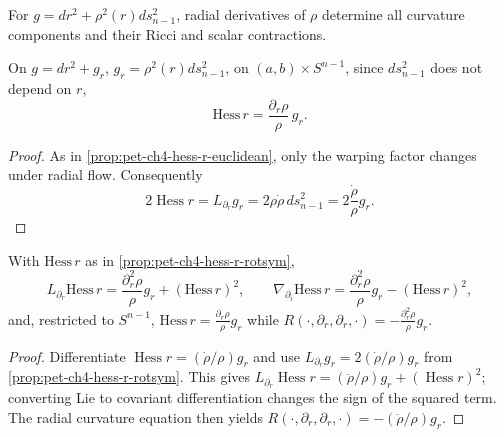 For $g=dr^2+\rho^2(r)ds_{n-1}^2$, radial derivatives of $\rho$ determine all
curvature components and their Ricci and scalar contractions.

\begin{proposition}
  \label{prop:pet-ch4-hess-r-rotsym}

  On $g=dr^2+g_r$, $g_r=\rho^2(r)ds_{n-1}^2$, on $(a,b)\times S^{n-1}$, since
  $ds_{n-1}^2$ does not depend on $r$,
  \[
    \mathrm{Hess}\,r=\frac{\partial_r\rho}{\rho}\,g_r.
  \]
\end{proposition}
\begin{proof}
  \sketch
  As in \cref{prop:pet-ch4-hess-r-euclidean}, only the warping factor changes
  under radial flow. Consequently
  \[
    2\operatorname{Hess}r=L_{\partial_r}g_r
    =2\rho\dot\rho\,ds_{n-1}^2
    =2\frac{\dot\rho}{\rho}g_r.
  \]
\end{proof}

\begin{lemma}
  \label{lem:pet-ch4-hess-r-derivatives}

  With $\mathrm{Hess}\,r$ as in \cref{prop:pet-ch4-hess-r-rotsym},
  \[
    L_{\partial_r}\mathrm{Hess}\,r=\frac{\partial_r^2\rho}{\rho}g_r+(\mathrm{Hess}\,r)^2,
    \qquad
    \nabla_{\partial_i}\mathrm{Hess}\,r=\frac{\partial_r^2\rho}{\rho}g_r-(\mathrm{Hess}\,r)^2,
  \]
  and, restricted to $S^{n-1}$, $\mathrm{Hess}\,r=\tfrac{\partial_r\rho}{\rho}g_r$
  while $R(\cdot,\partial_r,\partial_r,\cdot)=-\tfrac{\partial_r^2\rho}{\rho}g_r$.
\end{lemma}
\begin{proof}
  \sketch
  Differentiate $\operatorname{Hess}r=(\dot\rho/\rho)g_r$ and use
  $L_{\partial_r}g_r=2(\dot\rho/\rho)g_r$ from
  \cref{prop:pet-ch4-hess-r-rotsym}. This gives
  $L_{\partial_r}\operatorname{Hess}r=(\ddot\rho/\rho)g_r+
  (\operatorname{Hess}r)^2$; converting Lie to covariant differentiation changes
  the sign of the squared term. The radial curvature equation then yields
  $R(\cdot,\partial_r,\partial_r,\cdot)=-(\ddot\rho/\rho)g_r$.
\end{proof}



